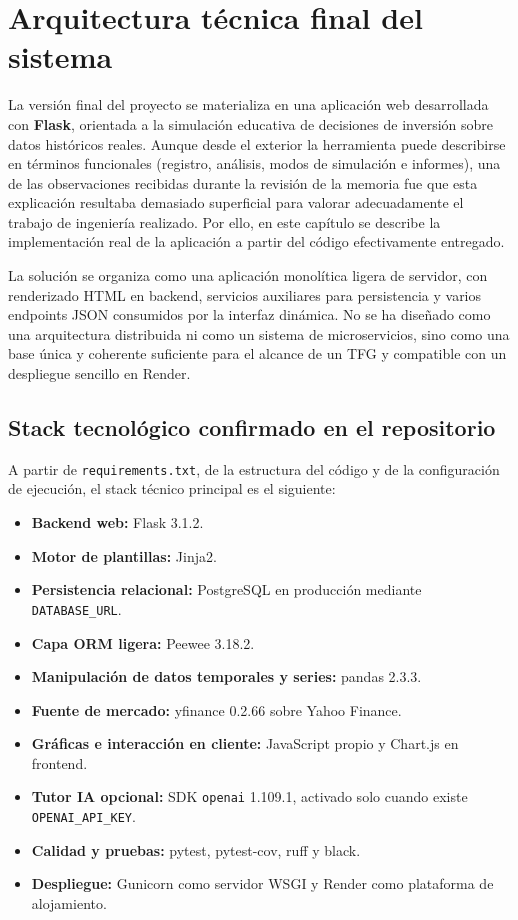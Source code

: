 \section{Arquitectura técnica final del sistema}

La versión final del proyecto se materializa en una aplicación web desarrollada con \textbf{Flask}, orientada a la simulación educativa de decisiones de inversión sobre datos históricos reales. Aunque desde el exterior la herramienta puede describirse en términos funcionales (registro, análisis, modos de simulación e informes), una de las observaciones recibidas durante la revisión de la memoria fue que esta explicación resultaba demasiado superficial para valorar adecuadamente el trabajo de ingeniería realizado. Por ello, en este capítulo se describe la implementación real de la aplicación a partir del código efectivamente entregado.

La solución se organiza como una aplicación monolítica ligera de servidor, con renderizado HTML en backend, servicios auxiliares para persistencia y varios endpoints JSON consumidos por la interfaz dinámica. No se ha diseñado como una arquitectura distribuida ni como un sistema de microservicios, sino como una base única y coherente suficiente para el alcance de un TFG y compatible con un despliegue sencillo en Render.

\subsection{Stack tecnológico confirmado en el repositorio}

A partir de \texttt{requirements.txt}, de la estructura del código y de la configuración de ejecución, el stack técnico principal es el siguiente:

\begin{itemize}
    \item \textbf{Backend web:} Flask 3.1.2.
    \item \textbf{Motor de plantillas:} Jinja2.
    \item \textbf{Persistencia relacional:} PostgreSQL en producción mediante \texttt{DATABASE\_URL}.
    \item \textbf{Capa ORM ligera:} Peewee 3.18.2.
    \item \textbf{Manipulación de datos temporales y series:} pandas 2.3.3.
    \item \textbf{Fuente de mercado:} yfinance 0.2.66 sobre Yahoo Finance.
    \item \textbf{Gráficas e interacción en cliente:} JavaScript propio y Chart.js en frontend.
    \item \textbf{Tutor IA opcional:} SDK \texttt{openai} 1.109.1, activado solo cuando existe \texttt{OPENAI\_API\_KEY}.
    \item \textbf{Calidad y pruebas:} pytest, pytest-cov, ruff y black.
    \item \textbf{Despliegue:} Gunicorn como servidor WSGI y Render como plataforma de alojamiento.
\end{itemize}

